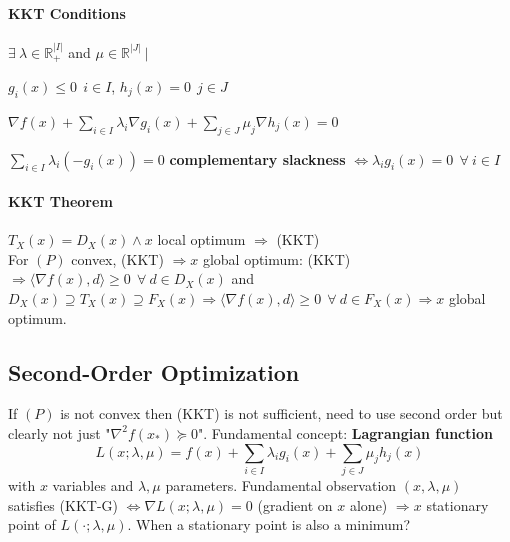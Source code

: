 \documentclass[10pt]{report}
\begin{document}
\paragraph{KKT Conditions} $\exists\:\lambda\in \mathbb{R}_+^{|I|}$ and $\mu\in \mathbb{R}^{|J|}\:|$\begin{list}{}{}
	\item[(KKT-F)] $g_i(x)\leq 0\:\:i\in I$, $h_j(x) = 0\:\:j\in J$
	\item[(KKT-G)] $\nabla f(x) + \sum_{i\in I}\lambda_i\nabla g_i(x) + \sum_{j\in J}\mu_j\nabla h_j(x) = 0$
	\item[(KKT-CS)] $\sum_{i\in I}\lambda_i(-g_i(x)) = 0$ \textbf{complementary slackness} $\Leftrightarrow \lambda_ig_i(x) = 0\:\:\forall\:i\in I$
\end{list}
\paragraph{KKT Theorem} $T_X(x)=D_X(x)\wedge x$ local optimum $\Rightarrow$ (KKT)\\
For $(P)$ convex, (KKT) $\Rightarrow x$ global optimum: (KKT) $\Rightarrow \langle \nabla f(x), d\rangle \geq 0\:\:\forall\:d\in D_X(x)$ and $D_X(x)\supseteq T_X(x)\supseteq F_X(x) \Rightarrow\langle \nabla f(x), d\rangle \geq 0\:\:\forall\:d\in F_X(x)\Rightarrow x$ global optimum.
\subsection{Second-Order Optimization}
If $(P)$ is not convex then (KKT) is not sufficient, need to use second order but clearly not just "$\nabla^2 f(x_*)\succeq 0$". Fundamental concept: \textbf{Lagrangian function} $$L(x;\lambda, \mu)=f(x) + \sum_{i\in I} \lambda_ig_i(x) + \sum_{j\in J}\mu_jh_j(x)$$ with $x$ variables and $\lambda,\mu$ parameters. Fundamental observation $(x,\lambda,\mu)$ satisfies (KKT-G) $\Leftrightarrow \nabla L(x;\lambda,\mu) = 0$ (gradient on $x$ alone) $\Rightarrow x$ stationary point of $L(\cdot;\lambda,\mu)$. When a stationary point is also a minimum?
\end{document}
